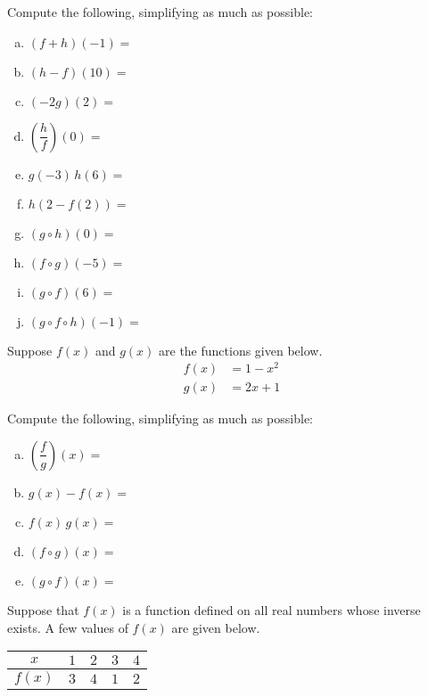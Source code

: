 \documentclass[12pt,letterpaper]{exam}
\begin{document}
\begin{questions}
Compute the following, simplifying as much as possible: \pspace
        \begin{enumerate}[(a)]
        \item $(f + h)(-1)=$ \vfill
        \item $(h - f)(10)=$ \vfill
        \item $(-2g)(2)=$ \vfill
        \item $\left( \dfrac{h}{f} \right)(0)=$ \vfill
        \item $g(-3)\, h(6)=$ \vfill
        \item $h(2 - f(2))=$ \vfill
        \item $(g \circ h)(0)=$ \vfill
	\item $(f \circ g)(-5)=$ \vfill
        \item $(g \circ f)(6)=$ \vfill
	\item $(g \circ f \circ h)(-1)=$ \vfill
        \end{enumerate} 



\newpage
\question[10] Suppose $f(x)$ and $g(x)$ are the functions given below. 
	\[
	\begin{aligned}
	f(x)&= 1 - x^2 \\[0.3cm]
	g(x)&= 2x + 1
	\end{aligned}
	\]

Compute the following, simplifying as much as possible: \pspace
        \begin{enumerate}[(a)]
	\item $\left( \dfrac{f}{g} \right)(x)=$ \vfill
        \item $g(x) - f(x)=$ \vfill
        \item $f(x) \, g(x)=$ \vfill
        \item $(f \circ g)(x)=$ \vfill
        \item $(g \circ f)(x)=$ \vfill
        \end{enumerate} 



\newpage
\question[10] Suppose that $f(x)$ is a function defined on all real numbers whose inverse exists. A few values of $f(x)$ are given below.
        \begin{table}[!ht]
        \centering
        \begin{tabular}{c || r | r | r | r} 
	$x$ & $1$ & $2$ & $3$ & $4$ \\ \hline
	$f(x)$ & $3$ & $4$ & $1$ & $2$
        \end{tabular}
        \end{table}


\end{questions}
\end{document}
